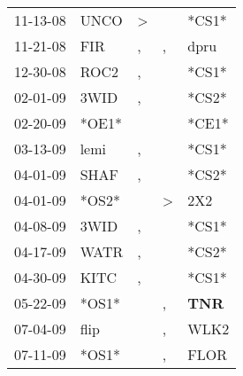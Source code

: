 \begin{supertabular}{p{0.07\textwidth}p{0.06\textwidth}p{0.02\textwidth}p{0.02\textwidth}p{0.06\textwidth}}
          11-13-08\textsuperscript{} &           UNCO\textsuperscript{} &     \textgreater &                  &                            *CS1* \\
          11-21-08\textsuperscript{} &            FIR\textsuperscript{} &                , &                , &           dpru\textsuperscript{} \\
          12-30-08\textsuperscript{} &           ROC2\textsuperscript{} &                , &                  &                            *CS1* \\
          02-01-09\textsuperscript{} &           3WID\textsuperscript{} &                , &                  &                            *CS2* \\
          02-20-09\textsuperscript{} &                            *OE1* &                  &                  &                            *CE1* \\
          03-13-09\textsuperscript{} &           lemi\textsuperscript{} &                , &                  &                            *CS1* \\
          04-01-09\textsuperscript{} &           SHAF\textsuperscript{} &                , &                  &                            *CS2* \\
          04-01-09\textsuperscript{} &                            *OS2* &                  &     \textgreater &            2X2\textsuperscript{} \\
          04-08-09\textsuperscript{} &           3WID\textsuperscript{} &                , &                  &                            *CS1* \\
          04-17-09\textsuperscript{} &           WATR\textsuperscript{} &                , &                  &                            *CS2* \\
          04-30-09\textsuperscript{} &           KITC\textsuperscript{} &                , &                  &                            *CS1* \\
          05-22-09\textsuperscript{} &                            *OS1* &                  &                , &   \textbf{TNR\textsuperscript{}} \\
          07-04-09\textsuperscript{} &           flip\textsuperscript{} &                  &                , &           WLK2\textsuperscript{} \\
          07-11-09\textsuperscript{} &                            *OS1* &                  &                , &           FLOR\textsuperscript{} \\

\end{supertabular}
